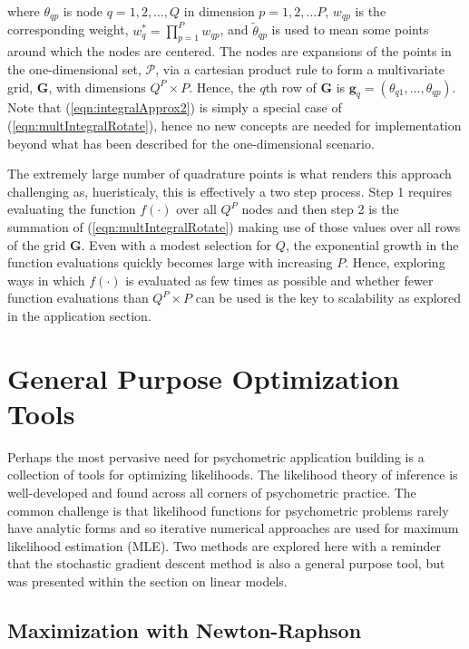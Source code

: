 \documentclass[12pt]{article}
\begin{document}
\noindent where $\theta_{qp}$ is node $q = 1, 2, \ldots, Q$ in dimension $p = 1,2, \ldots P$, $w_{qp}$ is the corresponding weight, $w_q^* = \prod^P_{p=1}w_{qp}$, and $\widetilde{\theta}_{qp}$ is used to mean some points around which the nodes are centered. The nodes are expansions of the points in the one-dimensional set, $\mathcal{P}$, via a cartesian product rule to form a multivariate grid, $\bm{G}$, with dimensions $Q^P\times P$. Hence, the $q$th row of $\bm{G}$ is $\bm{g}_q = (\theta_{q1}, \ldots, \theta_{qp})$.  Note that (\ref{eqn:integralApprox2}) is simply a special case of (\ref{eqn:multIntegralRotate}), hence no new concepts are needed for implementation beyond what has been described for the one-dimensional scenario. 

The extremely large number of quadrature points is what renders this approach challenging as, hueristicaly, this is effectively a two step process. Step 1 requires evaluating the function $f(\cdot)$ over all $Q^P$ nodes and then step 2 is the summation of (\ref{eqn:multIntegralRotate}) making use of those values over all rows of the grid $\bm{G}$. Even with a modest selection for $Q$, the exponential growth in the function evaluations quickly becomes large with increasing $P$. Hence, exploring ways in which $f(\cdot)$ is evaluated as few times as possible and whether fewer function evaluations than $Q^P\times P$ can be used is the key to scalability as explored in the application section. 

\section*{General Purpose Optimization Tools}

Perhaps the most pervasive need for psychometric application building is a collection of tools for optimizing likelihoods. The likelihood theory of inference is well-developed \cite{king:1998} and found across all corners of psychometric practice. The common challenge is that likelihood functions for psychometric problems rarely have analytic forms and so iterative numerical approaches are used for maximum likelihood estimation (MLE). Two methods are explored here with a reminder that the stochastic gradient descent method is also a general purpose tool, but was presented within the section on linear models.

\subsection*{Maximization with Newton-Raphson}
\end{document}
